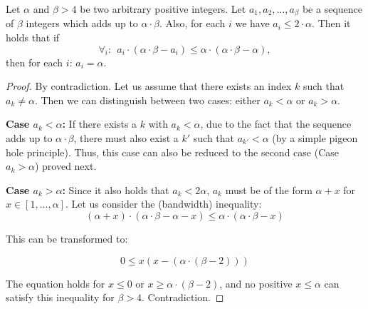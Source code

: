 \documentclass[conference,10pt]{IEEEtran}
\newcommand{\clauses}{\alpha}
\newcommand{\variables}{\beta}
\begin{document}
\begin{lemma}\label{lem:bandwidth-lemma}
  Let $\clauses$ and $\variables > 4$ be two arbitrary positive integers. Let $a_1, a_2, \ldots,
  a_{\variables}$ be a sequence of $\variables$ integers which adds up to $\clauses \cdot \variables$. Also, for
  each $i$ we have $a_i \leq 2 \cdot \clauses$. Then it holds that if
  $$ \forall_i:~~ a_i \cdot (\clauses \cdot \variables - a_i) \leq \clauses \cdot (\clauses \cdot \variables -
  \clauses), $$
\noindent  then for each $i$: $a_i = \clauses$.
\end{lemma}
\begin{proof}
  By contradiction. Let us assume
that there exists an index $k$ such that
$a_k \neq \clauses$. Then we can distinguish between two cases:
either $a_k<\clauses$ or
$a_k>\clauses$.

\textbf{Case $a_k<\clauses$:} If there exists a $k$ with $a_k<\clauses$,
due to the fact that the sequence adds up to $\clauses \cdot \variables$,
there must also exist a $k'$ such that $a_{k'}<\clauses$ (by a simple
pigeon hole principle). Thus, this case can
also be reduced to the second case (Case $a_k>\clauses$) proved
next.

\textbf{Case $a_k>\clauses$:} Since it also holds that $a_k < 2\clauses$,
$a_k$ must be of the form $\clauses + x$ for $x \in [1, \ldots, \clauses]$.
Let us consider the (bandwidth) inequality:
$$ (\clauses + x) \cdot (\clauses \cdot \variables - \clauses - x) \leq \clauses \cdot (\clauses \cdot \variables - x) $$

This can be transformed to:

$$ 0 \leq x(x - (\clauses \cdot (\variables - 2))) $$

The equation holds for $x \leq 0$ or $x \geq \clauses \cdot (\variables - 2)$,
and no
positive $x \leq \clauses$ can satisfy this inequality for $\variables > 4$. Contradiction.
\end{proof}
\end{document}
